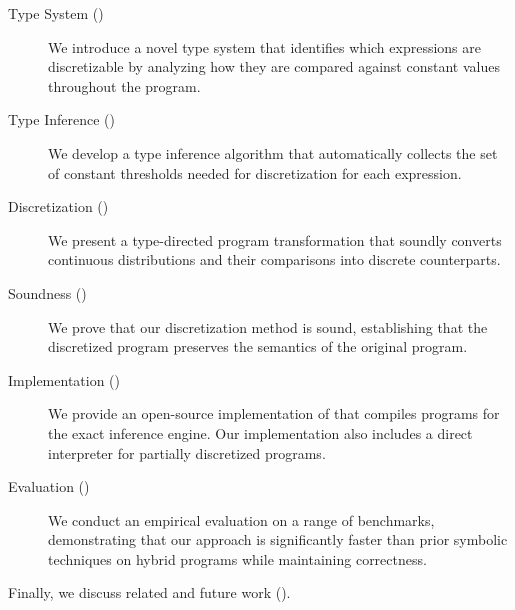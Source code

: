 \begin{description}
    \item[Type System ()] We introduce a novel type system that identifies which expressions are discretizable by analyzing how they are compared against constant values throughout the program.

    \item[Type Inference ()] We develop a type inference algorithm that automatically collects the set of constant thresholds needed for discretization for each expression.

    \item[Discretization ()] We present a type-directed program transformation that soundly converts continuous distributions and their comparisons into discrete counterparts.

    \item[Soundness ()] We prove that our discretization method is sound, establishing that the discretized program preserves the semantics of the original program.

    \item[Implementation ()] We provide an open-source implementation of \Slice{} that compiles programs for the \Dice{} exact inference engine. Our implementation also includes a direct interpreter for partially discretized programs.

    \item[Evaluation ()] We conduct an empirical evaluation on a range of benchmarks, demonstrating that our approach is significantly faster than prior symbolic techniques on hybrid programs while maintaining correctness.
\end{description}

Finally, we discuss related and future work ().

